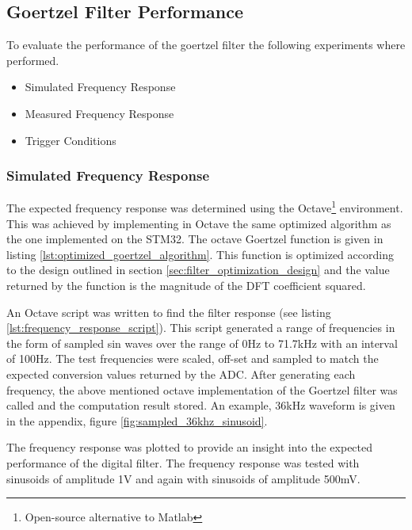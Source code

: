 



\subsection{Goertzel Filter Performance}

To evaluate the performance of the goertzel filter the following experiments where performed.

\begin{itemize}
	\item Simulated Frequency Response
	\item Measured Frequency Response
	\item Trigger Conditions
\end{itemize}

\subsubsection{Simulated Frequency Response}
The expected frequency response was determined using the Octave\footnote{Open-source alternative to Matlab} environment. This was achieved by implementing in Octave the same optimized algorithm as the one implemented on the STM32.
The octave Goertzel function is given in listing \ref{lst:optimized_goertzel_algorithm}. This function is optimized according to the design outlined in section \ref{sec:filter_optimization_design} and the value returned by the function is the magnitude of the DFT coefficient squared.

An Octave script was written to find the filter response (see listing \ref{lst:frequency_response_script}). This script generated a range of frequencies in the form of sampled sin waves over the range of 0Hz to 71.7kHz with an interval of 100Hz. The test frequencies were scaled, off-set and sampled to match the expected conversion values returned by the ADC.
After generating each frequency, the above mentioned octave implementation of the Goertzel filter was called and the computation result stored. An example, 36kHz waveform is given in the appendix, figure \ref{fig:sampled_36khz_sinusoid}.

The frequency response was plotted to provide an insight into the expected performance of the digital filter. The frequency response was tested with sinusoids of amplitude 1V and again with sinusoids of amplitude 500mV.

